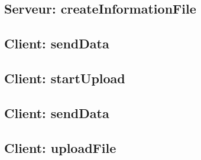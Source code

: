 \documentclass[11pt]{beamer}
\begin{document}
		\begin{frame}
			
		\end{frame}

		\begin{frame}
			
		\end{frame}

	\subsection*{Serveur: createInformationFile}

		\begin{frame}
			
		\end{frame}

		\begin{frame}
			
		\end{frame}

	\subsection*{Client: sendData}
	
		\begin{frame}
			
		\end{frame}

	\subsection*{Client: startUpload}
	
		\begin{frame}
			
		\end{frame}

	\subsection*{Client: sendData}
	
		\begin{frame}
			
		\end{frame}

	\subsection*{Client: uploadFile}
	
		\begin{frame}
			
		\end{frame}

		\begin{frame}
			
		\end{frame}
\end{document}
